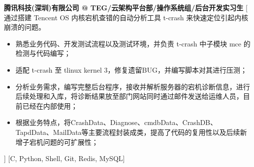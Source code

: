 \begin{experiences}
	{\textbf{腾讯科技(深圳)有限公司 @ TEG/云架构平台部/操作系统组/后台开发实习生}}%
	[
	通过搭建 Tencent OS 内核宕机查错的自动分析工具 t-crash 来快速定位引起内核崩溃的问题。
	\begin{itemize}
		\item {熟悉业务代码、开发测试流程以及测试环境，并负责 t-crash 中子模块 mce 的检测与代码编写；}
		\item {适配 t-crash 至 tlinux kernel 3，修复遗留BUG，并编写脚本对其进行压测；}
		\item {分析业务需求，编写完整后台程序，接收并解析服务器的宕机诊断信息，进行后续处理和入库，将诊断结果放至部门网站同时通过邮件发送给运维人员，目前已经在内部使用；}
		\item {根据业务特点，将CrashData、Diagnose、cmdbData、CrashDB、TapdData、MailData等主要流程封装成类，提高了代码的复用性以及后续新增子宕机问题的可扩展性；}
	\end{itemize}
	]
	[C, Python, Shell, Git, Redis, MySQL]
	
\end{experiences}